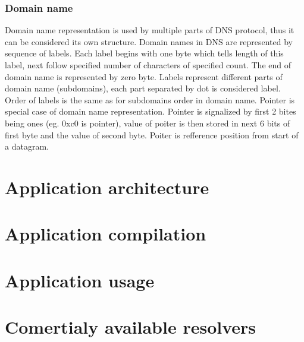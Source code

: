 \documentclass[11pt, a4paper]{article}
\begin{document}
\subsubsection{Domain name}
Domain name representation is used by multiple parts of DNS protocol, thus it can be considered its own structure. Domain names in DNS
are represented by sequence of labels. Each label begins with one byte which tells length of this label, next follow specified number of 
characters of specified count. The end of domain name is represented by zero byte. Labels represent different parts of domain name (subdomains),
each part separated by dot is considered label. Order of labels is the same as for subdomains order in domain name. Pointer is special case of 
domain name representation. Pointer is signalized by first 2 bites being ones (eg. 0xc0 is pointer), value of poiter is then stored in next 6 bits 
of first byte and the value of second byte. Poiter is refference position from start of a datagram.
\section{Application architecture}

\section{Application compilation}
\section{Application usage}

\section{Comertialy available resolvers}
\end{document}
